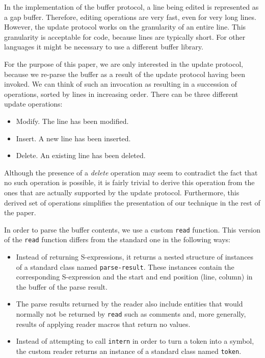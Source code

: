 In the implementation of the buffer protocol, a line being edited is
represented as a gap buffer.  Therefore, editing operations are very
fast, even for very long lines.  However, the update protocol works on
the granularity of an entire line.  This granularity is acceptable for
\commonlisp{} code, because lines are typically short.  For other
languages it might be necessary to use a different buffer library.

For the purpose of this paper, we are only interested in the update
protocol, because we re-parse the buffer as a result of the update
protocol having been invoked.  We can think of such an invocation as
resulting in a succession of operations, sorted by lines in increasing
order.  There can be three different update operations:

\begin{itemize}
\item Modify.  The line has been modified.
\item Insert.  A new line has been inserted.
\item Delete.  An existing line has been deleted.
\end{itemize}

Although the presence of a \emph{delete} operation may seem to
contradict the fact that no such operation is possible, it is fairly
trivial to derive this operation from the ones that are actually
supported by the update protocol.  Furthermore, this derived set of
operations simplifies the presentation of our technique in the rest of
the paper.

In order to parse the buffer contents, we use a custom \texttt{read}
function.  This version of the \texttt{read} function differs from the
standard one in the following ways:

\begin{itemize}
\item Instead of returning S-expressions, it returns a nested
  structure of instances of a standard class named
  \texttt{parse-result}.  These instances contain the corresponding
  S-expression and the start and end position (line, column) in the
  buffer of the parse result.
\item The parse results returned by the reader also include entities
  that would normally not be returned by \texttt{read} such as
  comments and, more generally, results of applying reader macros
  that return no values.
\item Instead of attempting to call \texttt{intern} in order to turn a
  token into a symbol, the custom reader returns an instance of a
  standard class named \texttt{token}.
\end{itemize}

